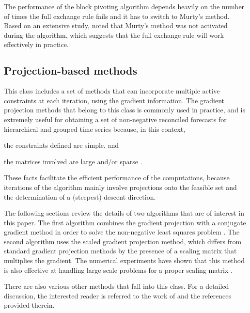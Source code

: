 \documentclass[11pt]{article}
\newcommand{\0}{\phantom{0}}
\begin{document}
The performance of the block pivoting algorithm depends heavily on the number of times the full exchange rule fails and it has to switch to Murty's method. Based on an extensive study, \citet{Kim2011} noted that Murty's method was not activated during the algorithm, which suggests that the full exchange rule will work effectively in practice.


\subsection{Projection-based methods}
This class includes a set of methods that can incorporate multiple active constraints at each iteration, using the gradient information. The gradient projection methods that belong to this class is commonly used in practice, and is extremely useful for obtaining a set of non-negative reconciled forecasts for hierarchical and grouped time series because, in this context, \begin{inparaenum}[(i)] \item the constraints defined are simple, and \item the matrices involved are large and/or sparse \citep{Nocedal2006}. \end{inparaenum} These facts facilitate the efficient performance of the computations, because iterations of the algorithm mainly involve projections onto the feasible set and the determination of a (steepest) descent direction.

The following sections review the details of two algorithms that are of interest in this paper. The first algorithm combines the gradient projection with a conjugate gradient method in order to solve the non-negative least squares problem \citep{Nocedal2006}. The second algorithm uses the scaled gradient projection method, which differs from standard gradient projection methods by the presence of a scaling matrix that multiplies the gradient. The numerical experiments have shown that this method is also effective at handling large scale problems for a proper scaling matrix \citep{Bonettini2009}.

There are also various other methods that fall into this class. For a detailed discussion, the interested reader is referred to the work of \citet{Chen2009} and the references provided therein.
\end{document}
